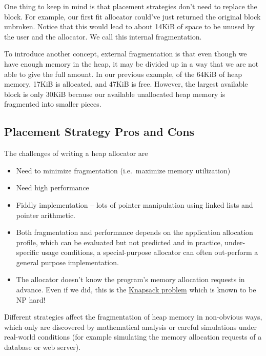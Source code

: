 One thing to keep in mind is that placement strategies don't need to replace the block.
For example, our first fit allocator could've just returned the original block unbroken.
Notice that this would lead to about 14KiB of space to be unused by the user and the allocator.
We call this internal fragmentation.

To introduce another concept, external fragmentation is that even though we have enough memory in the heap, it may be divided up in a way that we are not able to give the full amount.
In our previous example, of the 64KiB of heap memory, 17KiB is allocated, and 47KiB is free.
However, the largest available block is only 30KiB because our available unallocated heap memory is fragmented into smaller pieces.

\subsection{Placement Strategy Pros and Cons}

The challenges of writing a heap allocator are
\begin{itemize}
\item Need to minimize fragmentation (i.e.~maximize memory utilization)
\item Need high performance
\item Fiddly implementation -- lots of pointer manipulation using linked lists and pointer arithmetic.
\item Both fragmentation and performance depends on the application allocation profile, which can be evaluated but not predicted and in practice, under-specific usage conditions, a special-purpose allocator can often out-perform a general purpose implementation.
\item The allocator doesn't know the program's memory allocation requests in advance. Even if we did, this is the \href{http://en.wikipedia.org/wiki/Knapsack_problem}{Knapsack problem} which is known to be NP hard!
\end{itemize}

Different strategies affect the fragmentation of heap memory in non-obvious ways, which only are discovered by mathematical analysis or careful simulations under real-world conditions (for example simulating the memory allocation requests of a database or web server).

